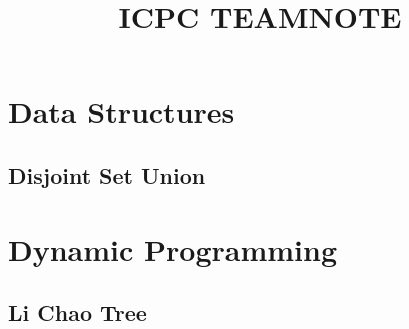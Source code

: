 \documentclass[landscape,8pt]{article}
\title{\Huge{\textsf{ICPC TEAMNOTE}}}
\author{}
\date{ }
\begin{document}
\newpage
\begin{multicols}{2}\raggedcolumns
    \tableofcontents
    \pagebreak
\end{multicols}
\begin{multicols}{2}\raggedcolumns


\section{Data Structures}
    \subsection{Disjoint Set Union}
        

\section{Dynamic Programming}
    \subsection{Li Chao Tree}
        
    \eject{}
\end{multicols}
\end{document}
